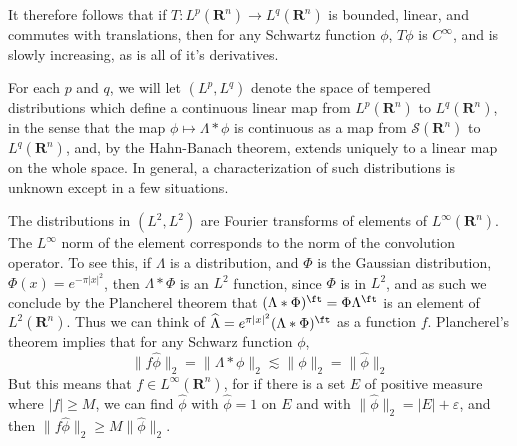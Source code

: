 \begin{remark}
	It therefore follows that if $T: L^p(\mathbf{R}^n) \to L^q(\mathbf{R}^n)$ is bounded, linear, and commutes with translations, then for any Schwartz function $\phi$, $T\phi$ is $C^\infty$, and is slowly increasing, as is all of it's derivatives.
\end{remark}

For each $p$ and $q$, we will let $(L^p,L^q)$ denote the space of tempered distributions which define a continuous linear map from $L^p(\mathbf{R}^n)$ to $L^q(\mathbf{R}^n)$, in the sense that the map $\phi \mapsto \Lambda * \phi$ is continuous as a map from $\mathcal{S}(\mathbf{R}^n)$ to $L^q(\mathbf{R}^n)$, and, by the Hahn-Banach theorem, extends uniquely to a linear map on the whole space. In general, a characterization of such distributions is unknown except in a few situations.

\begin{example}
	The distributions in $(L^2, L^2)$ are Fourier transforms of elements of $L^\infty(\mathbf{R}^n)$. The $L^\infty$ norm of the element corresponds to the norm of the convolution operator. To see this, if $\Lambda$ is a distribution, and $\Phi$ is the Gaussian distribution, $\Phi(x) = e^{-\pi|x|^2}$, then $\Lambda * \Phi$ is an $L^2$ function, since $\Phi$ is in $L^2$, and as such we conclude by the Plancherel theorem that $(\Lambda * \Phi)^\ft = \Phi \Lambda^\ft$ is an element of $L^2(\mathbf{R}^n)$. Thus we can think of $\widehat{\Lambda} = e^{\pi |x|^2} (\Lambda * \Phi)^\ft$ as a function $f$. Plancherel's theorem implies that for any Schwarz function $\phi$,
	\[ \| f \widehat{\phi} \|_2 = \| \Lambda * \phi \|_2 \lesssim \| \phi \|_2 = \| \widehat{\phi} \|_2 \]
	But this means that $f \in L^\infty(\mathbf{R}^n)$, for if there is a set $E$ of positive measure where $|f| \geq M$, we can find $\widehat{\phi}$ with $\widehat{\phi} = 1$ on $E$ and with $\| \widehat{\phi} \|_2 = |E| + \varepsilon$, and then $\| f \widehat{\phi} \|_2 \geq M \| \widehat{\phi} \|_2$.
\end{example}

